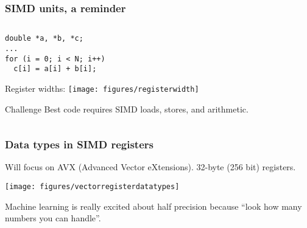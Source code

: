 \documentclass[presentation,aspectratio=43,10pt]{beamer}
\begin{document}
\begin{frame}[fragile]
  \frametitle{SIMD units, a reminder}
  \begin{columns}
    \begin{column}{0.4\textwidth}
\begin{verbatim}
double *a, *b, *c;
...
for (i = 0; i < N; i++)
  c[i] = a[i] + b[i];
\end{verbatim}

      \vspace{\baselineskip}
      Register widths:
      \vspace{\baselineskip}
      \texttt{[image: figures/registerwidth]}

      \begin{challenge}{Challenge}
        Best code requires SIMD loads, stores, and arithmetic.
      \end{challenge}
    \end{column}
    \begin{column}{0.6\textwidth}
    \end{column}
  \end{columns}
\end{frame}

\begin{frame}
  \frametitle{Data types in SIMD registers}
  Will focus on AVX (Advanced Vector eXtensions). 32-byte (256 bit)
  registers.

  \begin{center}
    \texttt{[image: figures/vectorregisterdatatypes]}
  \end{center}

  Machine learning is really excited about half precision because
  ``look how many numbers you can handle''.
\end{frame}
\end{document}
